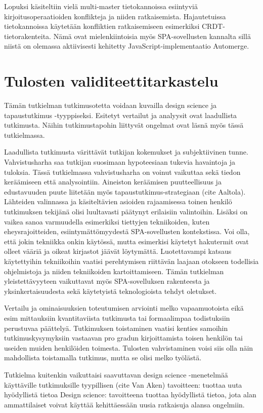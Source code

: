 \documentclass[finnish,twoside,censored,csm,sw-track-2018]{HYthesisML}
\begin{document}
Lopuksi käsiteltiin vielä multi-master tietokannoissa esiintyviä kirjoitusoperaatioiden konflikteja ja niiden ratkaisemista. Hajautetuissa tietokannoissa käytetään konfliktien ratkaisemiseen esimerkiksi CRDT-tietorakenteita. Nämä ovat mielenkiintoisia myös SPA-sovellusten kannalta sillä niistä on olemassa aktiivisesti kehitetty JavaScript-implementaatio Automerge.

\section{Tulosten validiteettitarkastelu}

Tämän tutkielman tutkimusotetta voidaan kuvailla design science ja tapaustutkimus -tyyppiseksi. Esitetyt vertailut ja analyysit ovat laadullista tutkimusta. Näihin tutkimustapohin liittyvät ongelmat ovat läsnä myös tässä tutkielmassa.

Laadullista tutkimusta värittävät tutkijan kokemukset ja subjektiivinen tunne. Vahvistusharha saa tutkijan suosimaan hypoteesiaan tukevia havaintoja ja tuloksia. Tässä tutkielmassa vahvistusharha on voinut vaikuttaa sekä tiedon keräämiseen että analysointiin. Aineiston keräämisen puutteellisuus ja edustavuuden puute liitetään myös  tapaustutkimus-strategiaan (cite Aaltola). Lähteiden valinnassa ja käsiteltävien asioiden rajaamisessa toinen henkilö tutkimuksen tekijänä olisi luultavasti päätynyt erilaisiin valintoihin. Lisäksi on vaikea sanoa varmuudella esimerkiksi tiettyjen tekniikoiden, kuten eheysrajoitteiden, esiintymättömyydestä SPA-sovellusten kontekstissa. Voi olla, että jokin tekniikka onkin käytössä, mutta esimerkisi käytetyt hakutermit ovat olleet vääriä ja oikeat kirjastot jäävät löytymättä. Luotettavampi katsaus käytettyihin tekniikoihin vaatisi perehtymisen riittävän laajaan otokseen todellisia ohjelmistoja ja niiden tekniikoiden kartoittamiseen. Tämän tutkielman yleistettävyyteen vaikuttavat myös SPA-sovelluksen rakenteesta ja yksinkertaisuudesta sekä käytetyistä teknologioista tehdyt oletukset.

Vertailu ja ominaisuuksien toteutumisen arviointi melko vapaamuotoista eikä esim mittauksiin kvantitaviista tutkimusta tai formaalimpaa todistuksiin perustuvaa päättelyä. Tutkimuksen toistaminen vaatisi kenties samoihin tutkimuskysymyksiin vastaavan pro gradun kirjoittamista toisen henkilön tai useiden muiden henkilöiden toimesta. Tulosten vahvistaminen voisi siis olla näin mahdollista toistamalla tutkimus, mutta se olisi melko työlästä.

Tutkielma kuitenkin vaikuttaisi saavuttavan design science -menetelmää käyttäville tutkimuksille tyypillisen (cite  Van Aken) tavoitteen: tuottaa uuta hyödyllistä tietoa 
Design science: tavoitteena tuottaa hyödyllistä tietoa, jota alan ammattilaiset voivat käyttää kehittäessään uusia ratkaisuja alansa ongelmiin.
\end{document}
